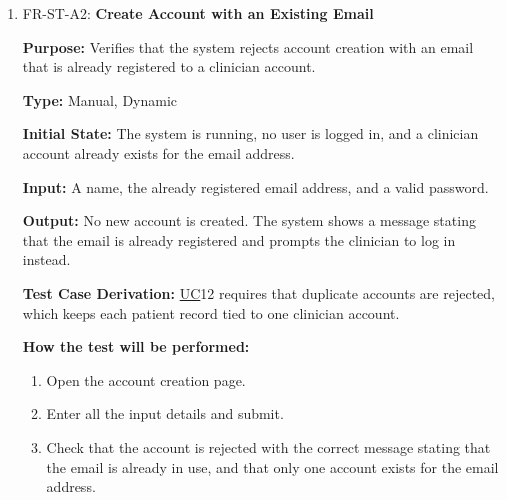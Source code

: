 \documentclass[12pt, titlepage]{article}
\newcommand{\srsuc}[1]{\href{https://github.com/Nour-Fawaz/MacaBoca/blob/main/pdfs/SRS/SRS.pdf}{UC}}
\renewcommand{\_}{\oldunderscore\allowbreak}
\begin{document}
\begin{enumerate}
  \item FR-ST-A2: \textbf{Create Account with an Existing Email\\}
  \begin{mdframed}[linewidth=0.5mm]
      \textbf{Purpose:} Verifies that the system rejects account creation with an email that is already registered to a clinician account. \par
      \textbf{Type:} Manual, Dynamic \par
      \textbf{Initial State:} The system is running, no user is logged in, and a clinician account already exists for the email address. \par
      \textbf{Input:} A name, the already registered email address, and a valid password. \par
      \textbf{Output:} No new account is created. The system shows a message stating that the email is already registered and prompts the clinician to log in instead. \par
      \textbf{Test Case Derivation:} \srsuc*{12} requires that duplicate accounts are rejected, which keeps each patient record tied to one clinician account. \par
      \textbf{How the test will be performed:}
      \begin{enumerate}
          \item[1.] Open the account creation page.
          \item[2.] Enter all the input details and submit.
          \item[3.] Check that the account is rejected with the correct message stating that the email is already in use, and that only one account exists for the email address.
      \end{enumerate}
  \end{mdframed}


\end{enumerate}
\end{document}
